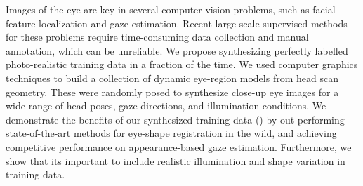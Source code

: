 Images of the eye are key in several computer vision problems, such as facial feature localization and gaze estimation.
Recent large-scale supervised methods for these problems require time-consuming data collection and manual annotation, which can be unreliable.
We propose synthesizing perfectly labelled photo-realistic training data in a fraction of the time.
We used computer graphics techniques to build a collection of dynamic eye-region models from head scan geometry.
%
These were randomly posed to synthesize close-up eye images for a wide range of head poses, gaze directions, and illumination conditions.
%
We demonstrate the benefits of our synthesized training data (\dataset) by out-performing state-of-the-art methods for eye-shape registration in the wild, and achieving competitive performance on appearance-based gaze estimation.
Furthermore, we show that its important to include realistic illumination and shape variation in training data.